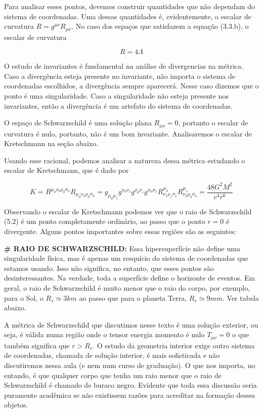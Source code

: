 \documentclass[11pt]{article}
\begin{document}
Para analisar esses pontos, devemos construir quantidades que não
dependam do sistema de coordenadas. Uma dessas quantidades é,
evidentemente, o escalar de curvatura \(R = g^{\mu\nu} R_{\mu\nu}\). No
caso dos espaços que satisfazem a equação (3.3.b), o escalar de
curvatura

\[ \tag{5.3} R = 4 \Lambda \]

O estudo de invariantes é fundamental na análise de divergencias na
métrica. Caso a divergência esteja presente no invariante, não importa o
sistema de coordenadas escolhidos, a divergência sempre aparecerá. Nesse
caso dizemos que o ponto é uma singularidade. Caso a singularidade não
esteja presente nos invariantes, então a divergência é um artefato do
sistema de coordenadas.

O espaço de Schwarzschild é uma solução plana \(R_{\mu\nu}=0\), portanto
o escalar de curvatura é nulo, portanto, não é um bom invariante.
Analisaremos o escalar de Kretschmann na seção abaixo.

Usando esse racional, podemos analisar a natureza dessa métrica
estudando o escalar de Kretschmann, que é dado por

\[ \tag{5.4} K = R^{\mu_0 \nu_0 \rho_0 \sigma_0} R_{\mu_0 \nu_0 \rho_0 \sigma_0} = g_{\mu_0 \mu_1} g^{\nu_0 \nu_1} g^{\rho_0 \rho_1} g^{\sigma_0 \sigma_1} R^{\mu_0}_{\nu_1 \rho_1 \sigma_1} R^{\mu_1}_{\nu_0 \rho_0\sigma_0} = \frac{48 G^2 M^2}{c^4 r^6} \]

    Observando o escalar de Kretschmann podemos ver que o raio de
Schwarzschild (5.2) é um ponto completamente ordinário, ao passo que o
ponto \(r=0\) é divergente. Alguns pontos importantes sobre essas
regiões são as seguintes:

    \textbf{\# RAIO DE SCHWARZSCHILD:} Essa hipersuperfície não define uma
singularidade física, mas é apenas um resquício do sistema de
coordenadas que estamos usando. Isso não significa, no entanto, que
esses pontos são desinteressantes. Na verdade, toda a superfície define
o horizonte de eventos. Em geral, o raio de Schwarzschild é muito menor
que o raio do corpo, por exemplo, para o Sol, o \(R_s \simeq 3 km\) ao
passo que para o planeta Terra, \(R_s \simeq 9 mm\). Ver tabela abaixo.

A métrica de Schwarzschild que discutimos nesse texto é uma solução
exterior, ou seja, é válida numa região onde o tensor energia momento é
nulo \(T_{\mu\nu} = 0\) o que também significa que \(r > R_s\). O estudo
da geometria interior exige outro sistema de coordenadas, chamada de
solução interior, é mais sofisticada e não discutiremos nessa aula (e
nem num curso de graduação). O que nos importa, no entando, é que
qualquer corpo que tenha um raio menor que o raio de Schwarzschild é
chamado de buraco negro. Evidente que toda essa discussão seria
puramente acadêmica se não existissem razões para acreditar na formação
desses objetos.
\end{document}
